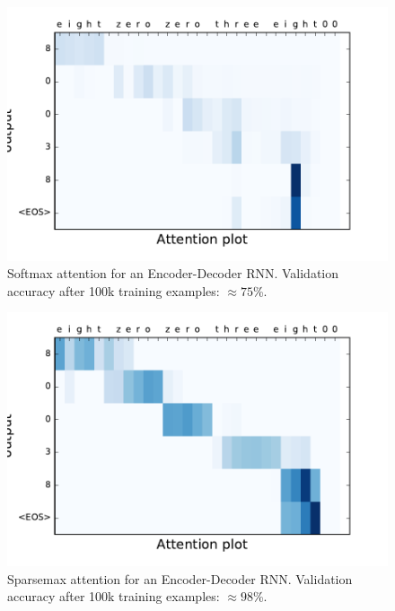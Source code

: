 \begin{figure}[H]
	\centering
	\includegraphics[scale=0.5,trim={5mm 12mm 5mm 5mm},clip]{figures/attention_softmax.pdf}
	\caption{Softmax attention for an Encoder-Decoder RNN. Validation accuracy after 100k training examples: $\approx 75$\%.}
	\label{fig:softmax}
\end{figure}
\begin{figure}[H]
 	\centering
 	\includegraphics[scale=0.5,trim={5mm 12mm 5mm 5mm},clip]{figures/attention_sparsemax.pdf}
 	\caption{Sparsemax attention for an Encoder-Decoder RNN. Validation accuracy after 100k training examples: $\approx 98$\%.}
 	\label{fig:sparsemax}
\end{figure}
  
